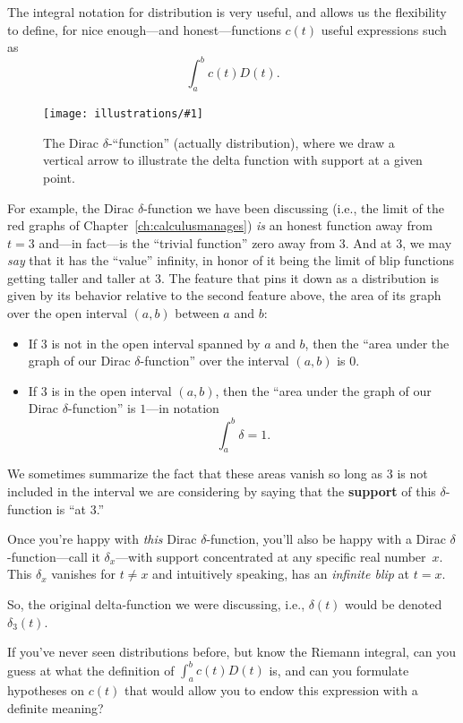 \documentclass[openany]{book}
\newcommand{\ill}[3]{%
   \begin{figure}[H]%
   \vspace{-2ex}
   \centering%
   \texttt{[image: illustrations/\#1]}%
   \caption{#3}%
   \vspace{-2ex}
    \end{figure}}
\theoremstyle{plain}
\theoremstyle{definition}
\begin{document}
{  The integral notation for distribution is very useful, and allows us
  the flexibility to define, for nice enough---and honest---functions
  $c(t)$ useful expressions such as $$\int_a^bc(t)D(t).$$

 \ill{dirac_delta}{0.5}{The Dirac $\delta$-``function'' (actually
   distribution), where we draw a vertical arrow to illustrate the
   delta function with support at a given point.}

 For example, the Dirac $\delta$-function we have been discussing
 (i.e., the limit of the red graphs of Chapter~\ref{ch:calculusmanages}) {\it is}
 an honest function away from $t=3$ and---in fact---is the ``trivial
 function'' zero away from $3$.  And at $3$, we may {\it say}
 that it has the ``value'' infinity, in honor of it being the limit of
 blip functions getting taller and taller at $3$. The feature that
 pins it down as a distribution is given by its behavior relative to
 the second feature above, the area of its graph over the open
 interval $(a,b)$ between $a$ and $b$:

\begin{itemize}
\item If $3$ is
  not in the open interval spanned by $a$ and $b$, then the ``area
  under the graph of our Dirac $\delta$-function'' over
  the interval $(a,b)$
  is $0$.
\item If $3$ is in the open interval $(a,b)$, then the ``area under the
  graph of our Dirac $\delta$-function'' is $1$---in
  notation $$\int_a^b\delta = 1.$$
\end{itemize}




We sometimes summarize the fact that these areas vanish so long as $3$
is not included in the interval we are considering by saying
that the {\bf support} of this $\delta$-function is ``at $3$.''


Once you're happy with {\it this} Dirac $\delta$-function, you'll also
be happy with a Dirac $\delta$-function---call it $\delta_x$---with
support concentrated at any specific real number~$x$.
This $\delta_x$ vanishes for $t \ne x$ and intuitively speaking, has an
{\it infinite blip} at $t=x$.

So, the original delta-function we were discussing, i.e., $\delta(t)$
would be denoted $\delta_3(t)$.

  If you've never seen distributions
 before, but know the Riemann integral, can you guess at what the
 definition of $\int_a^bc(t)D(t)$ is, and can you formulate hypotheses
 on $c(t)$ that would allow you to endow this expression with a
 definite meaning?


}
\end{document}
